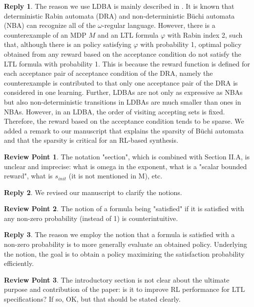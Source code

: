 \documentclass[10 pt, dvipdfmx]{article}
\theoremstyle{definition}
\newtheorem{review point}{Review Point}[section]
\newtheorem*{reply}{Reply}
\begin{document}
\begin{reply}
  The reason we use LDBA is mainly described in \cite{Hahn2019}. It is known that deterministic Rabin automata (DRA) and non-deterministic B\"{u}chi automata (NBA) can recognize all of the $\omega$-regular language. However, there is a counterexample of an MDP $M$ and an LTL formula $\varphi$ with Rabin index 2, such that, although there is an policy satisfying $\varphi$ with probability 1, optimal policy obtained from any reward based on the acceptance condition do not satisfy the LTL formula with probability 1. This is because the reward function is defined for each acceptance pair of acceptance condition of the DRA, namely the counterexample is contributed to that only one acceptance pair of the DRA is considered in one learning. Further, LDBAs are not only as expressive as NBAs but also non-deterministic transitions in LDBAs are much smaller than ones in NBAs.
  However, in an LDBA, the order of visiting accepting sets is fixed. Therefore, the reward based on the acceptance condition tends to be sparse. We added a remark to our manuscript that explains the sparsity of B\"{u}chi automata and that the sparsity is critical for an RL-based synthesis.
\end{reply}

\begin{review point}
  The notation "section", which is combined with Section II.A, is
unclear and imprecise: what is omega in the exponent, what is a "scalar
bounded reward", what is $s_{init}$ (it is not mentioned in M), etc.
\end{review point}

\begin{reply}
  We revised our manuscript to clarify the notions.
\end{reply}

\begin{review point}
  The notion of a formula being "satisfied" if it is satisfied with any
non-zero probability (instead of 1) is counterintuitive.
\end{review point}

\begin{reply}
  The reason we employ the notion that a formula is satisfied with a non-zero probability is to more generally evaluate an obtained policy. Underlying the notion, the goal is to obtain a policy maximizing the satisfaction probability efficiently.
\end{reply}

\begin{review point}
  The introductory section is not clear about the ultimate purpose and
contribution of the paper: is it to improve RL performance for LTL
specifications? If so, OK, but that should be stated clearly.
\end{review point}
\end{document}
